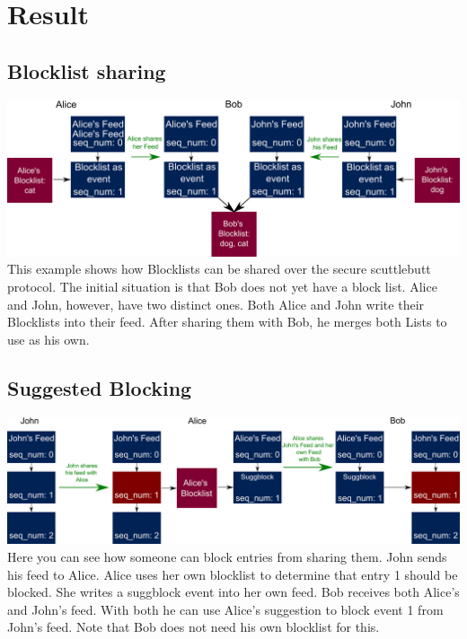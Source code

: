 \documentclass[12pt]{article}
\begin{document}
\section{Result}

\subsection{Blocklist sharing}
\vspace{0.5cm}
\includegraphics[width=\textwidth]{graph2}\vspace{0.5cm}
This example shows how Blocklists can be shared over the secure scuttlebutt protocol.
The initial situation is that Bob does not yet have a block list. Alice and John, however, have two distinct ones.
Both Alice and John write their Blocklists into their feed.
After sharing them with Bob, he merges both Lists to use as his own.


\subsection{Suggested Blocking}
\vspace{0.5cm}
\includegraphics[width=\textwidth]{graph1}\vspace{0.5cm}
Here you can see how someone can block entries from sharing them.
John sends his feed to Alice. Alice uses her own blocklist to determine that entry 1 should be blocked.
She writes a suggblock event into her own feed. Bob receives both Alice's and John's feed. 
With both he can use Alice's suggestion to block event 1 from John's feed.
Note that Bob does not need his own blocklist for this.

\newpage
\end{document}
